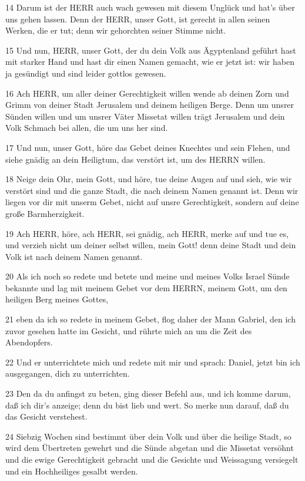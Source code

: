 \par 14 Darum ist der HERR auch wach gewesen mit diesem Unglück und hat's über uns gehen lassen. Denn der HERR, unser Gott, ist gerecht in allen seinen Werken, die er tut; denn wir gehorchten seiner Stimme nicht.
\par 15 Und nun, HERR, unser Gott, der du dein Volk aus Ägyptenland geführt hast mit starker Hand und hast dir einen Namen gemacht, wie er jetzt ist: wir haben ja gesündigt und sind leider gottlos gewesen.
\par 16 Ach HERR, um aller deiner Gerechtigkeit willen wende ab deinen Zorn und Grimm von deiner Stadt Jerusalem und deinem heiligen Berge. Denn um unsrer Sünden willen und um unsrer Väter Missetat willen trägt Jerusalem und dein Volk Schmach bei allen, die um uns her sind.
\par 17 Und nun, unser Gott, höre das Gebet deines Knechtes und sein Flehen, und siehe gnädig an dein Heiligtum, das verstört ist, um des HERRN willen.
\par 18 Neige dein Ohr, mein Gott, und höre, tue deine Augen auf und sieh, wie wir verstört sind und die ganze Stadt, die nach deinem Namen genannt ist. Denn wir liegen vor dir mit unserm Gebet, nicht auf unsre Gerechtigkeit, sondern auf deine große Barmherzigkeit.
\par 19 Ach HERR, höre, ach HERR, sei gnädig, ach HERR, merke auf und tue es, und verzieh nicht um deiner selbst willen, mein Gott! denn deine Stadt und dein Volk ist nach deinem Namen genannt.
\par 20 Als ich noch so redete und betete und meine und meines Volks Israel Sünde bekannte und lag mit meinem Gebet vor dem HERRN, meinem Gott, um den heiligen Berg meines Gottes,
\par 21 eben da ich so redete in meinem Gebet, flog daher der Mann Gabriel, den ich zuvor gesehen hatte im Gesicht, und rührte mich an um die Zeit des Abendopfers.
\par 22 Und er unterrichtete mich und redete mit mir und sprach: Daniel, jetzt bin ich ausgegangen, dich zu unterrichten.
\par 23 Den da du anfingst zu beten, ging dieser Befehl aus, und ich komme darum, daß ich dir's anzeige; denn du bist lieb und wert. So merke nun darauf, daß du das Gesicht verstehest.
\par 24 Siebzig Wochen sind bestimmt über dein Volk und über die heilige Stadt, so wird dem Übertreten gewehrt und die Sünde abgetan und die Missetat versöhnt und die ewige Gerechtigkeit gebracht und die Gesichte und Weissagung versiegelt und ein Hochheiliges gesalbt werden.
